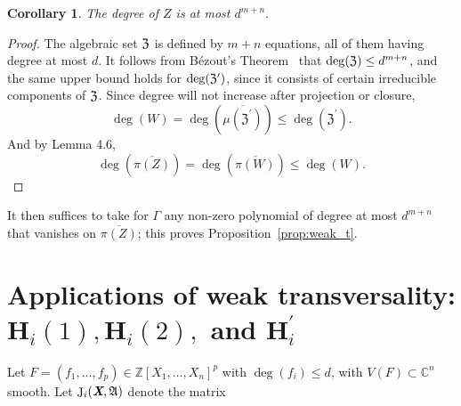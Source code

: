 \documentclass[a4paper]{article}
\def\fZp{{\mathfrak Z^{'}}}
\def\A{\mathfrak{A}}
\def\Xb{\textit{\textbf{X}}}
\DeclareMathOperator{\J}{J}
\newcommand{\ZZ}{{\mathbb{Z}}}
\def\C{\mathbb{C}}
\newtheorem{corollary}[theorem]{Corollary}
\begin{document}
    \begin{corollary} 
      The degree of $Z$ is at most $d^{m+n}.$
    \end{corollary}
    \begin{proof}
      The algebraic set $\frak Z$ is defined by $m+n$ equations, all of
      them having degree at most $d$. It follows from B\'ezout's
      Theorem~\cite{H} that $\deg(\frak{Z}) \leq d^{m+n}$, and the same
      upper bound holds for $\deg(\frak{Z}')$, since it consists of
      certain irreducible components of $\frak Z$. Since degree will not increase after projection or closure, 
      \[
      \deg (W) = \deg( \overline{\mu(\fZp)}) \leq \deg(\fZp).
      \]
      And by Lemma 4.6,
      \[
      \deg(\overline{\pi(Z)})
      =
      \deg(\overline{\pi(W)})
      \leq
      \deg(W).
      \]
    \end{proof}
    \noindent
    It then suffices to take for $\Gamma$ any
    non-zero polynomial of degree at most $d^{m+n}$ that vanishes on
    $\overline{\pi(Z)}$; this proves Proposition~\ref{prop:weak_t}.


\section{Applications of weak transversality: $\textbf{H}_i(1), \textbf{H}_i(2),$ and $\textbf{H}_i^{'}$}\label{sec:5}

Let $F=(f_1,\hdots,f_p) \in \ZZ[X_1,\hdots,X_n]^p$ with $\deg(f_i)\leq d$, with $V(F)
\subset \C^n$ smooth. Let $\J_i(\Xb,\A)$ denote the matrix
    
\end{document}
